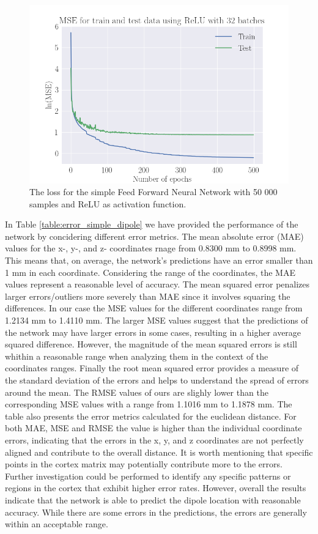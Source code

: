 \documentclass[a4paper, UKenglish, 11pt]{uiomaster}
\begin{document}
\begin{figure}[!htb]
    \centering
    \includegraphics[width=\linewidth]{figures/MSE_simple_dipole_lr0.001_RELU_500_50000_ReLU_32_500_N_dipoles_1.png}
    \caption{The loss for the simple Feed Forward Neural Network with 50 000 samples and ReLU as activation function.}
    \label{fig:single_dipole_accuracy}
\end{figure}

In Table \ref{table:error_simple_dipole} we have provided the performance of the network by concidering different error metrics. The mean absolute error (MAE) values for the x-, y-, and z- coordinates rnage from 0.8300 mm to 0.8998 mm. This means that, on average, the network's predictions have an error smaller than 1 mm in each coordinate. Considering the range of the coordinates, the MAE values represent a reasonable level of accuracy. The mean squared error penalizes larger errors/outliers more severely than MAE since it involves squaring the differences. In our case the MSE values for the different coordinates range from 1.2134 mm to 1.4110 mm. The larger MSE values suggest that the predictions of the network may have larger errors in some cases, resulting in a higher average squared difference. However, the magnitude of the mean squared errors is still whithin a reasonable range when analyzing them in the context of the coordinates ranges. Finally the root mean squared error provides a measure of the standard deviation of the errors and helps to understand the spread of errors around the mean. The RMSE values of ours are slighly lower than the corresponding MSE values with a range from 1.1016 mm to 1.1878 mm. The table also presents the error metrics calculated for the euclidean distance. For both MAE, MSE and RMSE the value is higher than the individual coordinate errors, indicating that the errors in the x, y, and z coordinates are not perfectly aligned and contribute to the overall distance. It is worth mentioning that specific points in the cortex matrix may potentially contribute more to the errors. Further investigation could be performed to identify any specific patterns or regions in the cortex that exhibit higher error rates. However, overall the results indicate that the network is able to predict the dipole location with reasonable accuracy. While there are some errors in the predictions, the errors are generally within an acceptable range.
\end{document}
